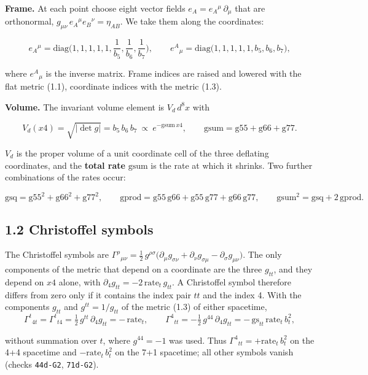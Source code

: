 \documentclass[
  10pt,
]{article}
\begin{document}
\textbf{Frame.} At each point choose eight vector fields
\(e_A=e_A{}^\mu\,\partial_\mu\) that are orthonormal,
\(g_{\mu\nu}\,e_A{}^\mu e_B{}^\nu=\eta_{AB}\). We take them along the
coordinates:

\[e_A{}^\mu=\mathrm{diag}\Big(1,1,1,1,1,\frac1{b_5},\frac1{b_6},\frac1{b_7}\Big),\qquad
e^A{}_\mu=\mathrm{diag}\big(1,1,1,1,1,b_5,b_6,b_7\big),\tag{1.4}\]

where \(e^A{}_\mu\) is the inverse matrix. Frame indices are raised and
lowered with the flat metric (1.1), coordinate indices with the metric
(1.3).

\textbf{Volume.} The invariant volume element is \(V_d\,d^8x\) with

\[V_d(x4)=\sqrt{|\det g|}=b_5\,b_6\,b_7\ \propto\ e^{-\mathrm{gsum}\,x4},\qquad
\mathrm{gsum}=\mathrm{g55}+\mathrm{g66}+\mathrm{g77}.\tag{1.5}\]

\(V_d\) is the proper volume of a unit coordinate cell of the three
deflating coordinates, and the \textbf{total rate} \(\mathrm{gsum}\) is
the rate at which it shrinks. Two further combinations of the rates
occur:

\[\mathrm{gsq}=\mathrm{g55}^2+\mathrm{g66}^2+\mathrm{g77}^2,\qquad
\mathrm{gprod}=\mathrm{g55}\,\mathrm{g66}+\mathrm{g55}\,\mathrm{g77}+\mathrm{g66}\,\mathrm{g77},\qquad
\mathrm{gsum}^2=\mathrm{gsq}+2\,\mathrm{gprod}.\tag{1.6}\]

\hypertarget{christoffel-symbols}{%
\subsection{1.2 Christoffel symbols}\label{christoffel-symbols}}

The Christoffel symbols are
\(\Gamma^\rho{}_{\mu\nu}=\tfrac12\,g^{\rho\sigma}\big(\partial_\mu g_{\sigma\nu}+\partial_\nu g_{\sigma\mu}-\partial_\sigma g_{\mu\nu}\big)\).
The only components of the metric that depend on a coordinate are the
three \(g_{tt}\), and they depend on \(x4\) alone, with
\(\partial_4 g_{tt}=-2\,\mathrm{rate}_t\,g_{tt}\). A Christoffel symbol
therefore differs from zero only if it contains the index pair \(tt\)
and the index 4. With the components \(g_{tt}\) and \(g^{tt}=1/g_{tt}\)
of the metric (1.3) of either spacetime,
\[\Gamma^t{}_{4t}=\Gamma^t{}_{t4}=\tfrac12\,g^{tt}\,\partial_4g_{tt}=-\,\mathrm{rate}_t,\qquad
\Gamma^4{}_{tt}=-\tfrac12\,g^{44}\,\partial_4g_{tt}=-\,\mathrm{gs}_{tt}\,\mathrm{rate}_t\,b_t^2,\tag{1.7}\]

without summation over \(t\), where \(g^{44}=-1\) was used. Thus
\(\Gamma^4{}_{tt}=+\mathrm{rate}_t\,b_t^2\) on the 4+4 spacetime and
\(-\mathrm{rate}_t\,b_t^2\) on the 7+1 spacetime; all other symbols
vanish (checks \texttt{44d-G2}, \texttt{71d-G2}).
\end{document}
